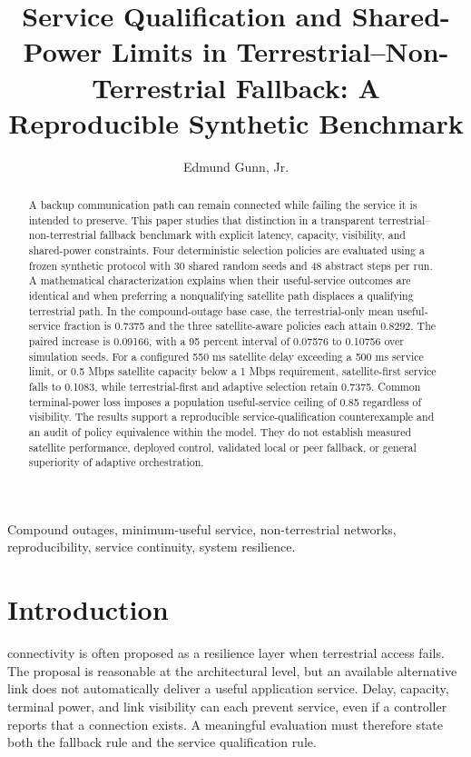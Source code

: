 \documentclass{IEEEoj}
\title{Service Qualification and Shared-Power Limits in Terrestrial--Non-Terrestrial Fallback: A Reproducible Synthetic Benchmark}
\author{Edmund Gunn, Jr.}
\affil{gunnchOS Research}
\begin{document}
\pagestyle{headings}
\begin{abstract}
A backup communication path can remain connected while failing the service it is intended to preserve. This paper studies that distinction in a transparent terrestrial--non-terrestrial fallback benchmark with explicit latency, capacity, visibility, and shared-power constraints. Four deterministic selection policies are evaluated using a frozen synthetic protocol with 30 shared random seeds and 48 abstract steps per run. A mathematical characterization explains when their useful-service outcomes are identical and when preferring a nonqualifying satellite path displaces a qualifying terrestrial path. In the compound-outage base case, the terrestrial-only mean useful-service fraction is 0.7375 and the three satellite-aware policies each attain 0.8292. The paired increase is 0.09166, with a 95 percent interval of 0.07576 to 0.10756 over simulation seeds. For a configured 550 ms satellite delay exceeding a 500 ms service limit, or 0.5 Mbps satellite capacity below a 1 Mbps requirement, satellite-first service falls to 0.1083, while terrestrial-first and adaptive selection retain 0.7375. Common terminal-power loss imposes a population useful-service ceiling of 0.85 regardless of visibility. The results support a reproducible service-qualification counterexample and an audit of policy equivalence within the model. They do not establish measured satellite performance, deployed control, validated local or peer fallback, or general superiority of adaptive orchestration.
\end{abstract}
\begin{IEEEkeywords}
Compound outages, minimum-useful service, non-terrestrial networks, reproducibility, service continuity, system resilience.
\end{IEEEkeywords}
\maketitle

\section{Introduction}
 connectivity is often proposed as a resilience layer when terrestrial access fails. The proposal is reasonable at the architectural level, but an available alternative link does not automatically deliver a useful application service. Delay, capacity, terminal power, and link visibility can each prevent service, even if a controller reports that a connection exists. A meaningful evaluation must therefore state both the fallback rule and the service qualification rule.
\end{document}
